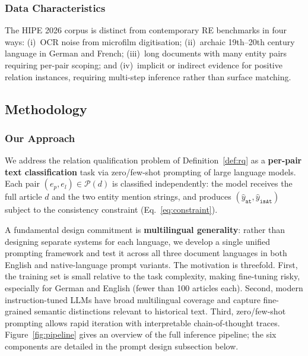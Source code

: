 \documentclass[
]{ceurart}
\theoremstyle{definition}
\begin{document}
\subsubsection{Data Characteristics}

The HIPE 2026 corpus is distinct from contemporary RE benchmarks in four ways: (i)~OCR noise from microfilm digitisation; (ii)~archaic 19th--20th century language in German and French; (iii)~long documents with many entity pairs requiring per-pair scoping; and (iv)~implicit or indirect evidence for positive relation instances, requiring multi-step inference rather than surface matching.

\subsection{Methodology}

\subsubsection{Our Approach}

We address the relation qualification problem of Definition~\ref{def:rq} as a \textbf{per-pair text classification} task via zero/few-shot prompting of large language models. Each pair $(e_p, e_l) \in \mathcal{P}(d)$ is classified independently: the model receives the full article $d$ and the two entity mention strings, and produces $(\hat{y}_{\texttt{at}}, \hat{y}_{\texttt{isAt}})$ subject to the consistency constraint (Eq.~\ref{eq:constraint}).

A fundamental design commitment is \textbf{multilingual generality}: rather than designing separate systems for each language, we develop a single unified prompting framework and test it across all three document languages in both English and native-language prompt variants.
The motivation is threefold.
First, the training set is small relative to the task complexity, making fine-tuning risky, especially for German and English (fewer than 100 articles each).
Second, modern instruction-tuned LLMs have broad multilingual coverage and capture fine-grained semantic distinctions relevant to historical text.
Third, zero/few-shot prompting allows rapid iteration with interpretable chain-of-thought traces.
Figure~\ref{fig:pipeline} gives an overview of the full inference pipeline; the six components are detailed in the prompt design subsection below.
\end{document}
